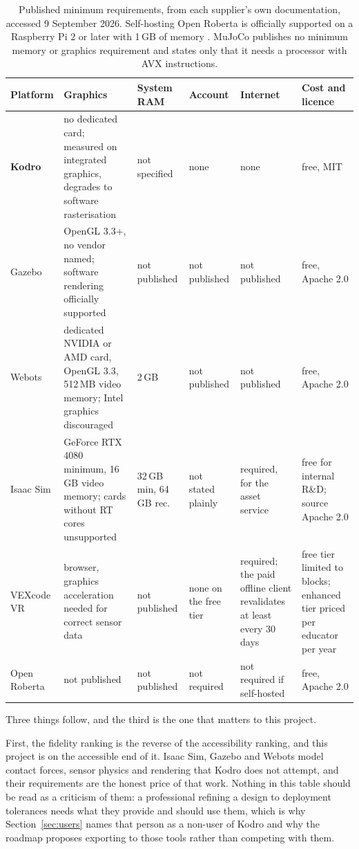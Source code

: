 \documentclass[11pt,a4paper]{report}
\begin{document}
\begin{table}[h]
\centering\footnotesize
\renewcommand{\arraystretch}{1.15}
\begin{tabular}{@{}p{2.05cm}p{3.0cm}p{1.5cm}p{1.65cm}p{1.6cm}p{3.5cm}@{}}
\toprule
Platform & Graphics & System RAM & Account & Internet & Cost and licence \\
\midrule
\textbf{Kodro} & no dedicated card; measured on integrated graphics, degrades to software rasterisation & not specified & none & none & free, MIT \\
Gazebo & OpenGL 3.3+, no vendor named; software rendering officially supported \citep{gazeboreq2026} & not published & not published & not published & free, Apache 2.0 \\
Webots & dedicated NVIDIA or AMD card, OpenGL 3.3, 512\,MB video memory; Intel graphics discouraged \citep{webotsreq2026} & 2\,GB & not published & not published & free, Apache 2.0 \\
Isaac Sim & GeForce RTX 4080 minimum, 16\,GB video memory; cards without RT cores unsupported \citep{isaacsim2026} & 32\,GB min, 64\,GB rec. & not stated plainly & required, for the asset service \citep{isaacsim2026} & free for internal R\&D; source Apache 2.0 \\
VEXcode VR & browser, graphics acceleration needed for correct sensor data \citep{vexvr2026} & not published & none on the free tier & required; the paid offline client revalidates at least every 30 days \citep{vexvr2026} & free tier limited to blocks; enhanced tier priced per educator per year \\
Open Roberta & not published & not published & not required \citep{openrobertalocal2026} & not required if self-hosted & free, Apache 2.0 \\
\bottomrule
\end{tabular}
\caption{Published minimum requirements, from each supplier's own documentation, accessed 9 September 2026. Self-hosting Open Roberta is officially supported on a Raspberry Pi 2 or later with 1\,GB of memory \citep{openrobertalocal2026}. MuJoCo publishes no minimum memory or graphics requirement and states only that it needs a processor with AVX instructions.}
\label{fig:platformcompare}
\end{table}

Three things follow, and the third is the one that matters to this project.

First, the fidelity ranking is the reverse of the accessibility ranking, and this project is on the accessible end of it. Isaac Sim, Gazebo and Webots model contact forces, sensor physics and rendering that Kodro does not attempt, and their requirements are the honest price of that work. Nothing in this table should be read as a criticism of them: a professional refining a design to deployment tolerances needs what they provide and should use them, which is why Section~\ref{sec:users} names that person as a non-user of Kodro and why the roadmap proposes exporting to those tools rather than competing with them.
\end{document}
